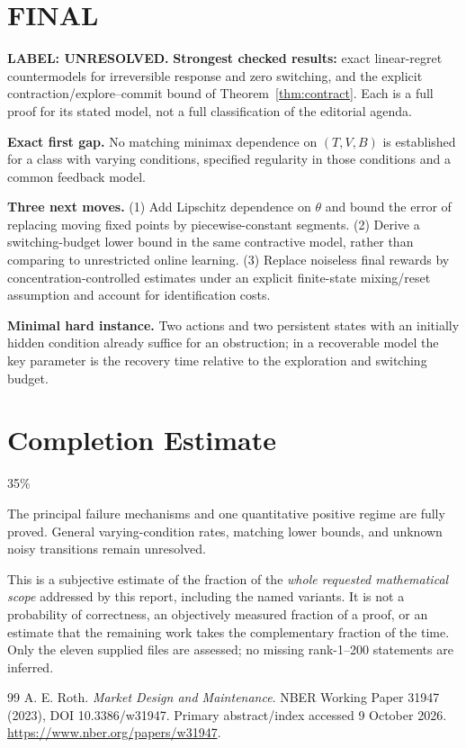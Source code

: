 \documentclass[11pt,a4paper]{article}
\theoremstyle{remark}\newtheorem{remark}[theorem]{Remark}
\begin{document}
\section{FINAL}
\textbf{LABEL: UNRESOLVED.}
\textbf{Strongest checked results:} exact linear-regret countermodels for irreversible response and zero switching, and the explicit contraction/explore--commit bound of Theorem~\ref{thm:contract}. Each is a full proof for its stated model, not a full classification of the editorial agenda.

\textbf{Exact first gap.} No matching minimax dependence on $(T,V,B)$ is established for a class with varying conditions, specified regularity in those conditions and a common feedback model.

\textbf{Three next moves.} (1) Add Lipschitz dependence on $\theta$ and bound the error of replacing moving fixed points by piecewise-constant segments. (2) Derive a switching-budget lower bound in the same contractive model, rather than comparing to unrestricted online learning. (3) Replace noiseless final rewards by concentration-controlled estimates under an explicit finite-state mixing/reset assumption and account for identification costs.

\textbf{Minimal hard instance.} Two actions and two persistent states with an initially hidden condition already suffice for an obstruction; in a recoverable model the key parameter is the recovery time relative to the exploration and switching budget.

\section{Completion Estimate}
35\%

The principal failure mechanisms and one quantitative positive regime are fully proved. General varying-condition rates, matching lower bounds, and unknown noisy transitions remain unresolved.

This is a subjective estimate of the fraction of the \emph{whole requested mathematical scope} addressed by this report, including the named variants. It is not a probability of correctness, an objectively measured fraction of a proof, or an estimate that the remaining work takes the complementary fraction of the time. Only the eleven supplied files are assessed; no missing rank-1--200 statements are inferred.

\begin{thebibliography}{99}
 A. E. Roth. \emph{Market Design and Maintenance}. NBER Working Paper 31947 (2023), DOI 10.3386/w31947. Primary abstract/index accessed 9 October 2026. \url{https://www.nber.org/papers/w31947}.
\end{thebibliography}
\end{document}

